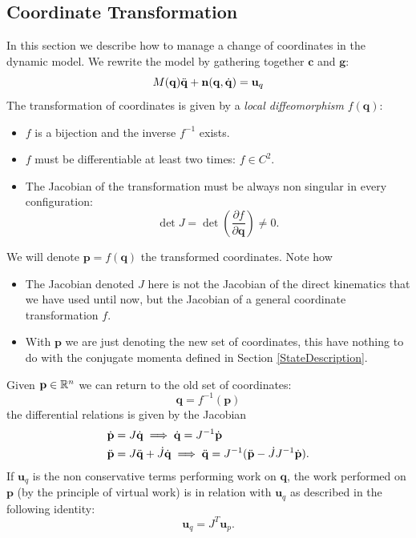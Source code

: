 \documentclass[10pt, a4paper]{report}
\newcommand{\q}{{\mathbf q}}
\begin{document}
\subsection{Coordinate Transformation}
In this section we describe how to manage a change of coordinates in the dynamic model. We rewrite the model by gathering together $\mathbf c$ and $\mathbf g$:\begin{equation}
    M(\q)\ddq+\mathbf n(\q,\dq)=\mathbf u_q
\end{equation}
The transformation of coordinates is given by  a \textit{local diffeomorphism} $f(\q)$:\begin{itemize}
    \item $f$ is a bijection and the inverse $f^{-1}$ exists. 
    \item $f$ must be differentiable at least two times: $f\in C^2$.
    \item The Jacobian of the transformation must be always non singular in every configuration:\begin{equation}
        \det J=\det\left(\frac{\partial f}{\partial \mathbf q}\right)\ne 0.
    \end{equation}
\end{itemize}
We will denote $\mathbf p=f(\q)$ the transformed coordinates. Note how \begin{itemize}
    \item The Jacobian denoted $J$ here  is not the Jacobian of the direct kinematics that we have used until now, but the Jacobian of a general coordinate transformation $f$.
    \item With $\mathbf p$ we are just denoting the new set of coordinates, this have nothing to do with the conjugate momenta defined in Section \ref{StateDescription}.
\end{itemize}
Given $\mathbf p\in {\mathbb R}^n$ we can return to the old set of coordinates:\begin{equation}
    \q=f^{-1}(\mathbf p)
\end{equation}
the differential relations is given by the Jacobian\begin{align}
    &\dot{\mathbf p} = J{\dot{\mathbf q}}\implies {\dot{\mathbf q}}=J^{-1}\dot{\mathbf p}\\
    &\ddot{\mathbf p}=J{\ddot{\mathbf q}}+\dot J{\dot{\mathbf q}}\implies 
    {\ddot{\mathbf q}} = J^{-1}(\ddot{\mathbf p}-\dot JJ^{-1}\dot{\mathbf p}).
\end{align}
If $\mathbf u_q$ is the non conservative terms performing work on $\q$, the work performed on $\mathbf p$ (by the principle of virtual work) is in relation with $\mathbf u_q$ as described in the following identity:\begin{equation}
    \mathbf u_q=J^T\mathbf u_p
    .
\end{equation}
\end{document}
